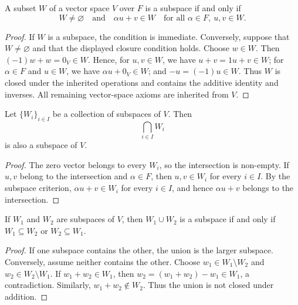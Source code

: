 \begin{Theorem}\label{thm:SubspaceCriterion}
A subset $W$ of a vector space $V$ over $F$ is a subspace if and only if
\begin{equation*}
W\ne\varnothing\quad\text{and}\quad
\alpha u+v\in W\quad\text{for all }\alpha\in F,\ u,v\in W.
\end{equation*}
\end{Theorem}
\begin{proof}
If $W$ is a subspace, the condition is immediate. Conversely, suppose that $W\ne\varnothing$ and that the displayed closure condition holds. Choose $w\in W$. Then $(-1)w+w=0_V\in W$. Hence, for $u,v\in W$, we have $u+v=1u+v\in W$; for $\alpha\in F$ and $u\in W$, we have $\alpha u+0_V\in W$; and $-u=(-1)u\in W$. Thus $W$ is closed under the inherited operations and contains the additive identity and inverses. All remaining vector-space axioms are inherited from $V$.
\end{proof}

\begin{Theorem}\label{thm:Intersection}
Let $\{W_i\}_{i\in I}$ be a collection of subspaces of $V$. Then
\begin{equation*}
\bigcap_{i\in I}W_i
\end{equation*}
is also a subspace of $V$.
\end{Theorem}
\begin{proof}
The zero vector belongs to every $W_i$, so the intersection is non-empty. If $u,v$ belong to the intersection and $\alpha\in F$, then $u,v\in W_i$ for every $i\in I$. By the subspace criterion, $\alpha u+v\in W_i$ for every $i\in I$, and hence $\alpha u+v$ belongs to the intersection.
\end{proof}

\begin{Theorem}
If $W_1$ and $W_2$ are subspaces of $V$, then $W_1\cup W_2$ is a subspace if and only if $W_1\subseteq W_2$ or $W_2\subseteq W_1$.
\end{Theorem}
\begin{proof}
If one subspace contains the other, the union is the larger subspace. Conversely, assume neither contains the other. Choose $w_1\in W_1\setminus W_2$ and $w_2\in W_2\setminus W_1$. If $w_1+w_2\in W_1$, then $w_2=(w_1+w_2)-w_1\in W_1$, a contradiction. Similarly, $w_1+w_2\notin W_2$. Thus the union is not closed under addition.
\end{proof}


